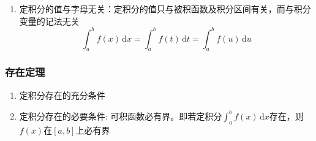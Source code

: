 \documentclass[a4paper,12pt]{article}
\begin{document}
\begin{enumerate}
        分点 $x_i$ 任取，一点 $\xi_i \in (x_{i-1}, x_i)$ 任取，
        故可做两个 {\color{red}{特取}}，
        即将 $[a,b]$ $n$ 等分且取每个小区间的右端点为 $\xi_i$，即
        \[
            \int_a^b f(x)\,\mathrm{d}x
            =
            \lim_{n \to \infty}
            \sum_{i=1}^{n}
            f\!\left(a + \frac{b-a}{n} i\right)
            \frac{b-a}{n}
        \]
        若将式子中的 $a,b$ 特殊化为 $0,1$ 这两个数，即
        \[
                {\color{red}{\bigstar\bigstar}}\int_0^1 f(x)\,\mathrm{d}x
            =
            \lim_{n \to \infty}
            \sum_{i=1}^{n}
            f\!\left(\frac{i}{n}\right)
            \frac{1}{n}
            =
            \lim_{n \to \infty}
            \sum_{i=1}^{n}
            f\!\left(\frac{2i - 1}{2n}\right)
            \frac{1}{n}, \quad\text{中点：}\frac{\displaystyle\frac{i - 1}{n} + \frac{i}{n}}{2}
        \]
        \item 定积分的值与字母无关：定积分的值只与被积函数及积分区间有关，而与积分变量的记法无关
        \[
            \int_a^b f(x)\,\mathrm{d}x = \int_a^b f(t)\,\mathrm{d}t = \int_a^b f(u)\,\mathrm{d}u
        \]
    \end{enumerate}

    \subsubsection{存在定理}

    \begin{enumerate}
        \item 定积分存在的充分条件
        \item 定积分存在的必要条件: 可积函数必有界。即若定积分$\int_a^b f(x)\,\mathrm{d}x$存在，则$f(x)$在$[a, b]$上必有界
    \end{enumerate}
\end{document}
